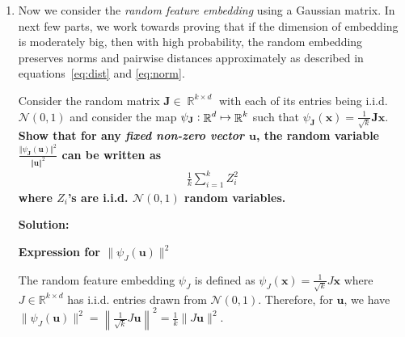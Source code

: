 \documentclass{article}
\DeclareMathOperator{\R}{\mathbb{R}}
\newcommand{\mat}[1]{\mathbf{#1}}
\renewcommand{\vec}[1]{\boldsymbol{\mathbf{#1}}}
\newenvironment{solution}{\color{blue} \smallskip \textbf{Solution:}}{}
\begin{document}
\begin{enumerate}
\begin{solution}
Secondly, using the conditions, we can bound the difference between the distances: \( |\|\psi(\mathbf{x}_i) - \psi(\mathbf{x}_j)\|^2 - \|\mathbf{x}_i - \mathbf{x}_j\|^2| \leq \epsilon \|\mathbf{x}_i - \mathbf{x}_j\|^2 \). Substitute the distance expressions: \( |2 \mathbf{x}_i^T \mathbf{x}_j - 2 \psi(\mathbf{x}_i)^T \psi(\mathbf{x}_j)| \leq \epsilon \|\mathbf{x}_i - \mathbf{x}_j\|^2 \). Dividing by 2, we obtain: \( |\mathbf{x}_i^T \mathbf{x}_j - \psi(\mathbf{x}_i)^T \psi(\mathbf{x}_j)| \leq \frac{\epsilon}{2} \|\mathbf{x}_i - \mathbf{x}_j\|^2 \).\\

Finally, using the fact that \(\|\mathbf{x}_i - \mathbf{x}_j\|^2 \leq 4\), we have \( |\psi(\mathbf{x}_i)^T \psi(\mathbf{x}_j) - \mathbf{x}_i^T \mathbf{x}_j| \leq C_\epsilon \), where \(C_\epsilon = 2 \epsilon\).




\end{solution}

\newpage
\item Now we consider the \emph{random feature embedding} using a Gaussian matrix.
In next few parts, we work towards proving that if the dimension of embedding
is moderately big, then with high probability, the random embedding preserves norms and pairwise 
distances approximately as described in equations~\eqref{eq:dist} and \eqref{eq:norm}.

Consider the random matrix $ \mat J \in \R^{k \times d}$ with each of its entries being i.i.d. $\mathcal{N}(0, 1)$
and consider the map $\psi_{\mat J}: \R^\dims \mapsto \R^k$ such that $\psi_{\mat J}(\vec{x})= \frac{1}{\sqrt{k}}\mat J \vec x$.
{\bf Show that for any \emph{fixed non-zero vector $\vec u$}, 
the random variable $\displaystyle\frac{\Vert \psi_{\mat J}(\vec u)\Vert^2}{\Vert \vec u\Vert^2}$ 
can be written as 
\begin{align*}
	\frac{1}{k}\sum_{i=1}^k Z_i^2
\end{align*}
where $Z_i$'s are i.i.d. $\mathcal{N}(0, 1)$ random variables.}

\begin{solution}


\textbf{Expression for \(\|\psi_J(\mathbf{u})\|^2\)}

The random feature embedding \(\psi_J\) is defined as \(\psi_J(\mathbf{x}) = \frac{1}{\sqrt{k}} J \mathbf{x}\) where \(J \in \mathbb{R}^{k \times d}\) has i.i.d. entries drawn from \(\mathcal{N}(0,1)\). Therefore, for \(\mathbf{u}\), we have \(\|\psi_J(\mathbf{u})\|^2 = \left\|\frac{1}{\sqrt{k}} J \mathbf{u}\right\|^2 = \frac{1}{k} \|J \mathbf{u}\|^2\).\\


\end{solution}
\end{enumerate}
\end{document}
